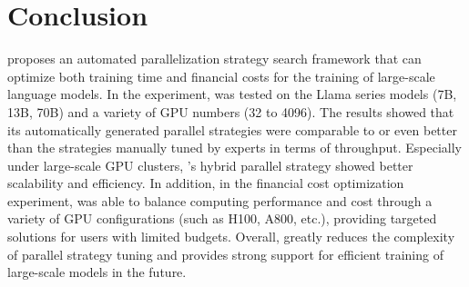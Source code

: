 \section{Conclusion}
\sysname proposes an automated parallelization strategy search framework that can optimize both training time and financial costs for the training of large-scale language models. In the experiment, \sysname was tested on the Llama series models (7B, 13B, 70B) and a variety of GPU numbers (32 to 4096). The results showed that its automatically generated parallel strategies were comparable to or even better than the strategies manually tuned by experts in terms of throughput. Especially under large-scale GPU clusters, \sysname's hybrid parallel strategy showed better scalability and efficiency. In addition, in the financial cost optimization experiment, \sysname was able to balance computing performance and cost through a variety of GPU configurations (such as H100, A800, etc.), providing targeted solutions for users with limited budgets. Overall, \sysname greatly reduces the complexity of parallel strategy tuning and provides strong support for efficient training of large-scale models in the future.




